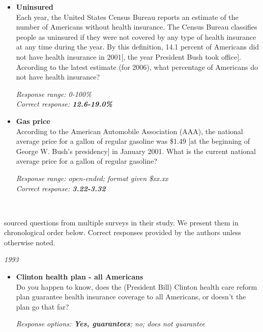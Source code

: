 \documentclass[12pt, letterpaper]{article}
\begin{document}
   \begin{itemize}
\item \textbf{Uninsured} \\
Each year, the United States Census Bureau reports an estimate of the number of Americans without health insurance. The Census Bureau classifies people as uninsured if they were not covered by any type of health insurance at any time during the year. By this definition, 14.1 percent of Americans did not have health insurance in 2001[, the year President Bush took office]. According to the latest estimate (for 2006), what percentage of Americans do not have health insurance? 

\textit{Response range: 0-100\%} \\
\textit{Correct response: \textbf{12.6-19.0\%}} 
   \end{itemize}

   \begin{itemize}
\item \textbf{Gas price} \\
According to the American Automobile Association (AAA), the national average price for a gallon of regular gasoline was \$1.49 [at the beginning of George W. Bush's presidency] in January 2001. What is the current national average price for a gallon of regular gasoline?

\textit{Response range: open-ended; format given \$xx.xx} \\
\textit{Correct response: \textbf{3.22-3.32}} 
   \end{itemize}
   
   \vspace{.2in}
   

\large {}
\vspace{.1in} \\
\normalsize

\noindent \citet{jerit2012partisan} sourced questions from multiple surveys in their study. We present them in chronological order below. Correct responses provided by the authors unless otherwise noted. 

\vspace{.2in}

 \large \noindent \textit{1993}
\normalsize
   \begin{itemize}
\item \textbf{Clinton health plan - all Americans} \\
Do you happen to know, does the (President Bill) Clinton health care reform plan guarantee health insurance coverage to all Americans, or doesn't the plan go that far? 

\textit{Response options: \textbf{Yes, guarantees}; no; does not guarantee} 
\end{itemize}
\end{document}
